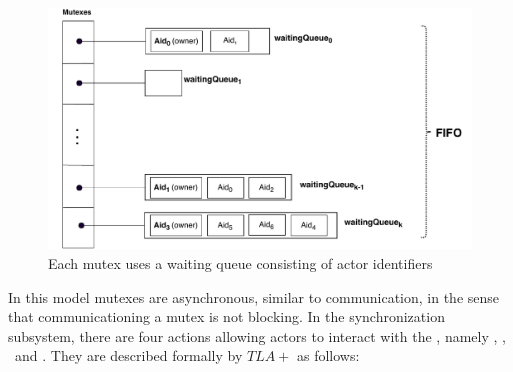 \documentclass[a4paper,11pt]{article}
\theoremstyle{break}
\begin{document}
\begin{figure}[H]
	\centerline{\includegraphics[scale=.55]{Figures/Mutexes.pdf}}
	\caption{ Each mutex uses a waiting queue consisting of actor identifiers}
\end{figure}

In this model mutexes are asynchronous, similar to communication, in the sense that communicationing a mutex is not blocking.  In the synchronization subsystem, there are four actions  allowing actors to interact with the \Mutexes, namely \mutexlock, \mutexunlock, \mutexwait~and \mutextest. They are described formally by $TLA+$ as follows:
 
\end{document}
